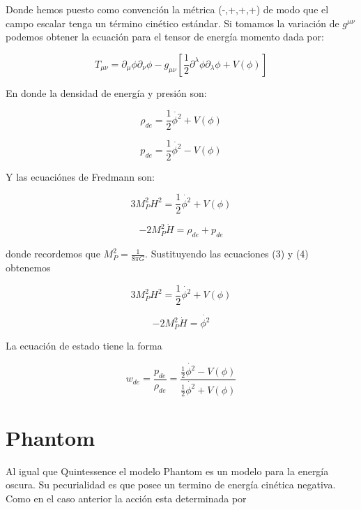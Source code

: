 \documentclass{article}
\begin{document}
Donde hemos puesto como convenci\'on la m\'etrica (-,+,+,+) de modo que el campo escalar tenga un t\'ermino cin\'etico est\'andar.
Si tomamos la variaci\'on de $g^{\mu \nu}$ podemos obtener la ecuaci\'on para el tensor de energ\'ia momento dada por:

\begin{equation}
T_{\mu \nu}=\partial_{\mu} \phi \partial_{\nu} \phi - g_{\mu \nu} [\frac{1}{2} \partial^{\lambda} \phi \partial_{\lambda} \phi + V(\phi) ]
\end{equation}

En donde la densidad de energ\'ia y presi\'on son:

\begin{equation}
\rho_{de} =\frac{1}{2} \dot{\phi^{2}} + V(\phi)
\end{equation} 

\begin{equation}
p_{de}=\frac{1}{2} \dot{\phi^{2}} -V(\phi)
\end{equation}

Y las ecuaci\'ones de Fredmann son:

\begin{equation}
3M_{P} ^{2} H^{2} =\frac{1}{2} \dot{\phi^{2}} + V(\phi)
\end{equation}

\begin{equation}
-2M_{P} ^{2} \dot{H} = \rho_{de} + p_{de}
\end{equation}

donde recordemos que $M_{P} ^{2}=\frac{1}{8\pi G}$. Sustituyendo las ecuaciones (3) y (4) obtenemos

\begin{equation}
3M_{P}^{2} H^{2} = \frac{1}{2} \dot{\phi^{2}} + V(\phi)       
\end{equation}

\begin{equation}
-2M_{P}^{2} \dot{H}=\dot{\phi^{2}}
\end{equation}

La ecuaci\'on de estado tiene la forma 

\begin{equation}
w_{de}=\frac{p_{de}}{\rho_{de}}=\frac{\frac{1}{2} \dot{\phi^{2}} -V(\phi)}{\frac{1}{2} \dot{\phi^{2}} + V(\phi)}
\end{equation}



\section*{Phantom}
Al igual que Quintessence el modelo Phantom es un modelo para la energ\'ia oscura. Su pecurialidad es que posee un termino de energ\'ia cin\'etica negativa. Como en el caso anterior la acci\'on esta determinada por
\end{document}

